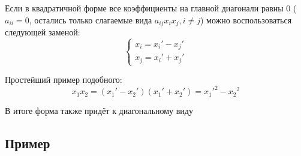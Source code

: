 \documentclass[12pt]{article}
\begin{document}
    Если в квадратичной форме все коэффициенты на главной диагонали равны $0$ ($a_{ii} = 0$, остались только слагаемые вида $a_{ij}x_ix_j, i \neq j$) можно воспользоваться следующей заменой:
    \[
        \begin{cases}
            x_i = x_i' - x_j' \\
            x_j = x_i' + x_j'
        \end{cases}
    \]

    Простейший пример подобного:
    \[
        x_1x_2 = (x_1' - x_2')(x_1' + x_2') = {x_1'}^2 - {x_2}^2
    \]

    В итоге форма также придёт к диагональному виду

    \subsection{Пример}
\end{document}
